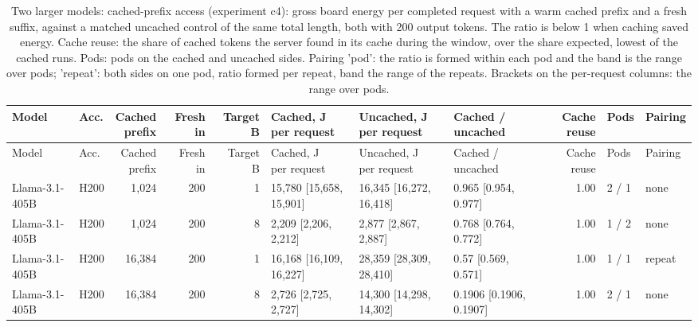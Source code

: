 \begin{landscape}
\begingroup
\scriptsize
\setlength{\tabcolsep}{3pt}
\begin{longtable}{llrrrlllrll}
\caption{Two larger models: cached-prefix access (experiment c4): gross board energy per completed request with a warm cached prefix and a fresh suffix, against a matched uncached control of the same total length, both with 200 output tokens. The ratio is below 1 when caching saved energy. Cache reuse: the share of cached tokens the server found in its cache during the window, over the share expected, lowest of the cached runs. Pods: pods on the cached and uncached sides. Pairing 'pod': the ratio is formed within each pod and the band is the range over pods; 'repeat': both sides on one pod, ratio formed per repeat, band the range of the repeats. Brackets on the per-request columns: the range over pods.}\label{tab:size_cached}\\
\toprule
Model & Acc. & \makecell[r]{Cached\\prefix} & Fresh in & Target B & \makecell[l]{Cached, J\\per request} & \makecell[l]{Uncached, J\\per request} & \makecell[l]{Cached /\\uncached} & Cache reuse & Pods & Pairing \\
\midrule
\endfirsthead
\toprule
Model & Acc. & \makecell[r]{Cached\\prefix} & Fresh in & Target B & \makecell[l]{Cached, J\\per request} & \makecell[l]{Uncached, J\\per request} & \makecell[l]{Cached /\\uncached} & Cache reuse & Pods & Pairing \\
\midrule
\endhead
\bottomrule
\endfoot
Llama-3.1-405B & H200 & 1,024 & 200 & 1 & 15,780 {[}15,658, 15,901{]} & 16,345 {[}16,272, 16,418{]} & 0.965 {[}0.954, 0.977{]} & 1.00 & 2 / 1 & none \\
Llama-3.1-405B & H200 & 1,024 & 200 & 8 & 2,209 {[}2,206, 2,212{]} & 2,877 {[}2,867, 2,887{]} & 0.768 {[}0.764, 0.772{]} & 1.00 & 1 / 2 & none \\
Llama-3.1-405B & H200 & 16,384 & 200 & 1 & 16,168 {[}16,109, 16,227{]} & 28,359 {[}28,309, 28,410{]} & 0.57 {[}0.569, 0.571{]} & 1.00 & 1 / 1 & repeat \\
Llama-3.1-405B & H200 & 16,384 & 200 & 8 & 2,726 {[}2,725, 2,727{]} & 14,300 {[}14,298, 14,302{]} & 0.1906 {[}0.1906, 0.1907{]} & 1.00 & 2 / 1 & none \\

\end{longtable}
\end{landscape}

